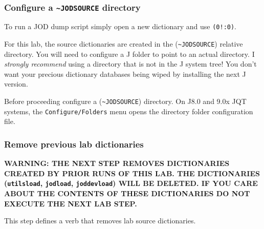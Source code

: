 \documentclass[11pt,letter,landscape]{article}
\begin{document}
    \begin{Verbatim}[commandchars=\\\{\}]


    \end{Verbatim}

    \subsubsection{\texorpdfstring{Configure a
\texttt{\textasciitilde{}JODSOURCE}
directory}{Configure a \textasciitilde{}JODSOURCE directory}}\label{configure-a-jodsource-directory}

To run a JOD dump script simply open a new dictionary and use
\texttt{(0!:0)}.

For this lab, the source dictionaries are created in the
(\texttt{\textasciitilde{}JODSOURCE}) relative directory. You will need
to configure a J folder to point to an actual directory. I
\emph{strongly recommend} using a directory that is not in the J system
tree! You don't want your precious dictionary databases being wiped by
installing the next J version.

Before proceeding configure a (\texttt{\textasciitilde{}JODSOURCE})
directory. On J8.0 and 9.0x JQT systems, the \texttt{Configure/Folders}
menu opens the directory folder configuration file.

    \subsubsection{Remove previous lab
dictionaries}\label{remove-previous-lab-dictionaries}

\textbf{WARNING: THE NEXT STEP REMOVES DICTIONARIES CREATED BY PRIOR
RUNS OF THIS LAB. THE DICTIONARIES (\texttt{utilsload},
\texttt{jodload}, \texttt{joddevload}) WILL BE DELETED. IF YOU CARE
ABOUT THE CONTENTS OF THESE DICTIONARIES DO NOT EXECUTE THE NEXT LAB
STEP.}

This step defines a verb that removes lab source dictionaries.
\end{document}
